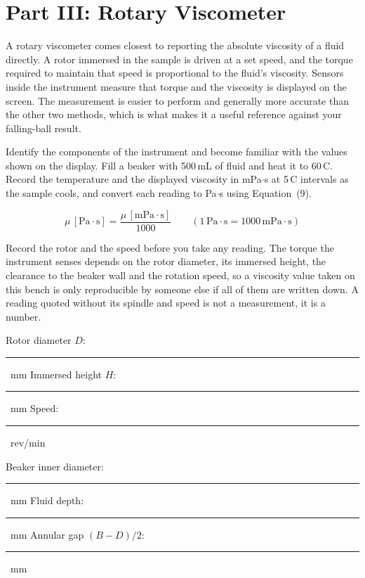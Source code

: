 \documentclass[11pt,a4paper]{article}
\newcommand{\bl}{\rule[-0.35em]{1.6cm}{0.4pt}}
\begin{document}
\section{Part III: Rotary Viscometer}
A rotary viscometer comes closest to reporting the absolute viscosity of a fluid directly. A rotor immersed in the
sample is driven at a set speed, and the torque required to maintain that speed is proportional
to the fluid's viscosity. Sensors inside the instrument measure that torque and the viscosity is
displayed on the screen. The measurement is easier to perform and generally more accurate than
the other two methods, which is what makes it a useful reference against your falling-ball
result.

Identify the components of the instrument and become familiar with the values shown on the
display. Fill a beaker with 500\,mL of fluid and heat it to 60\,\textdegree C. Record the
temperature and the displayed viscosity in mPa$\cdot$s at 5\,\textdegree C intervals as the
sample cools, and convert each reading to Pa$\cdot$s using Equation~(9).

\begin{equation}
  \mu\,[\mathrm{Pa\cdot s}] = \frac{\mu\,[\mathrm{mPa\cdot s}]}{1000}
  \qquad (1\,\mathrm{Pa\cdot s} = 1000\,\mathrm{mPa\cdot s})
\end{equation}

Record the rotor and the speed before you take any reading. The torque the instrument senses
depends on the rotor diameter, its immersed height, the clearance to the beaker wall and the
rotation speed, so a viscosity value taken on this bench is only reproducible by someone else if
all of them are written down. A reading quoted without its spindle and speed is not a
measurement, it is a number.

\smallskip
\noindent Rotor diameter $D$: \bl\ mm \hfill Immersed height $H$: \bl\ mm \hfill
Speed: \bl\ rev/min \par
\smallskip
\noindent Beaker inner diameter: \bl\ mm \hfill Fluid depth: \bl\ mm \hfill
Annular gap $(B-D)/2$: \bl\ mm \par
\end{document}
